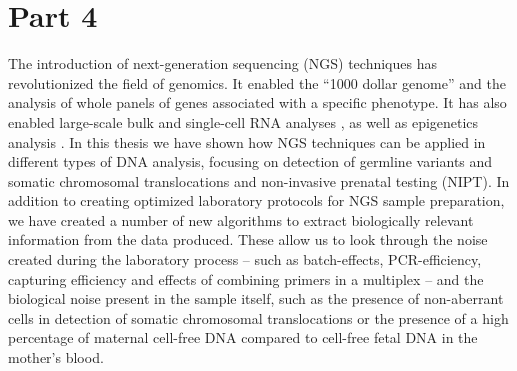 \chapter*{\fontsize{36}{50}\selectfont Part 4\, }
\label{chap:part4}


{ \Large {} }


\newpage

\noindent The introduction of next-generation sequencing (NGS) techniques has revolutionized the field of genomics. 
It enabled the “1000 dollar genome” \cite{Rincon_2014} and the analysis of whole panels of genes associated with a specific phenotype. 
It has also enabled large-scale bulk and single-cell RNA analyses \cite{van_der_Wijst_2018}, as well as epigenetics analysis \cite{Jiang_2018,Le_Dily_2017,Andrews_2018}. 
In this thesis we have shown how NGS techniques can be applied in different types of DNA analysis, focusing on detection of germline variants and somatic chromosomal translocations and non-invasive prenatal testing (NIPT). 
In addition to creating optimized laboratory protocols for NGS sample preparation, we have created a number of new algorithms to extract biologically relevant information from the data produced. 
These allow us to look through the noise created during the laboratory process – such as batch-effects, PCR-efficiency, capturing efficiency and effects of combining primers in a multiplex – and the biological noise present in the sample itself, such as the presence of non-aberrant cells in detection of somatic chromosomal translocations or the presence of a high percentage of maternal cell-free DNA compared to cell-free fetal DNA in the mother’s blood. 

